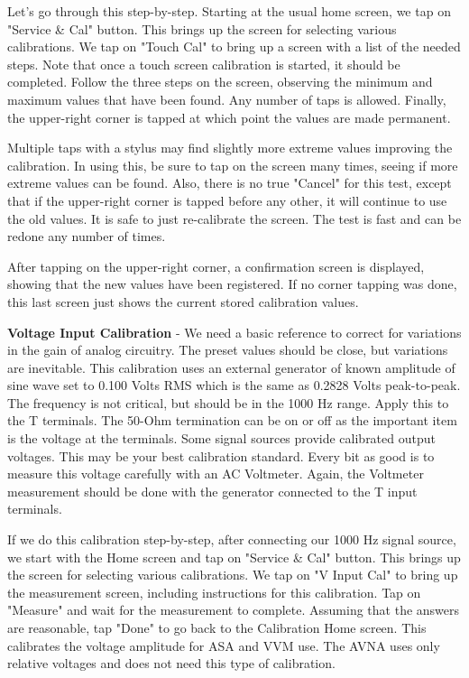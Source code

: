 Let's go through this step-by-step.  Starting at the usual home screen, we tap on "Service \& Cal" button. This brings up the screen for selecting various calibrations.  We tap on "Touch Cal" to bring up a screen with a list of the needed steps. Note that once a touch screen calibration is started, it should be completed.  Follow  the three steps on the screen, observing the minimum and maximum values that have been found.  Any number of taps is allowed.  Finally,  the upper-right corner is tapped at which point the values are made permanent. 

Multiple taps with a stylus may find slightly more extreme values improving the calibration.   In using this, be sure to tap on the screen many times, seeing if more extreme values can be found.  Also, there is no true "Cancel" for this test, except that if the upper-right corner is tapped before any  other, it will continue to use the old values.  It is safe to just re-calibrate the screen.  The test is fast and can be redone any number of times. 

After tapping on the upper-right corner, a confirmation screen is displayed, showing that the new values have been registered.  If no corner tapping was done, this last screen just shows the current stored calibration values.

\textbf{Voltage Input Calibration} - We need a basic reference to correct for variations in the gain of analog circuitry.  The preset values should be close, but variations are inevitable.  This calibration uses an external generator of known amplitude of sine wave set to 0.100 Volts RMS which is the same as 0.2828 Volts peak-to-peak. The frequency is not critical, but should be in the 1000 Hz range.  Apply this to the T terminals.  The 50-Ohm termination can be on or off as the important item is the voltage at the terminals.  Some signal sources provide calibrated output voltages.  This may be your best calibration standard.  Every bit as good is to measure this voltage carefully with an AC Voltmeter.  Again, the Voltmeter measurement should be done with the generator connected to the T input terminals.

If we do this calibration step-by-step, after connecting our 1000 Hz signal source,  we start with the Home screen and tap on "Service \& Cal" button. This brings up the screen for selecting various calibrations.  We tap on "V Input Cal" to bring up the measurement screen, including instructions for this calibration.  Tap on "Measure" and wait for the measurement to complete.  Assuming that the answers are reasonable, tap "Done" to go back to the Calibration Home screen.  This calibrates the voltage amplitude for ASA and VVM use.  The AVNA uses only relative voltages and does not need this type of calibration.

